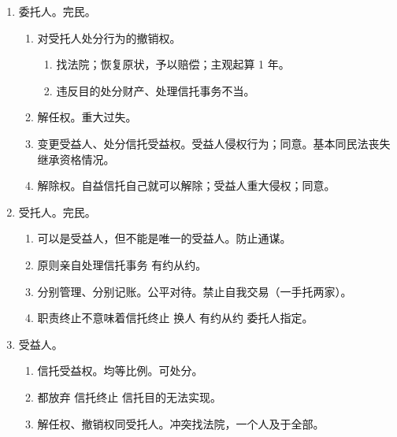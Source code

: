 \begin{enumerate}
\begin{enumerate}
        \end{enumerate}
  \item 委托人。完民。
        \begin{enumerate}
          \item 对受托人处分行为的撤销权。
                \begin{enumerate}
                  \item 找法院；恢复原状，予以赔偿；主观起算 1 年。
                  \item 违反目的处分财产、处理信托事务不当。
                \end{enumerate}
          \item 解任权。重大过失。
          \item 变更受益人、处分信托受益权。受益人侵权行为；同意。基本同民法丧失继承资格情况。
          \item 解除权。自益信托自己就可以解除；受益人重大侵权；同意。
        \end{enumerate}
  \item 受托人。完民。
        \begin{enumerate}
          \item 可以是受益人，但不能是唯一的受益人。防止通谋。
          \item 原则亲自处理信托事务 \yjt 有约从约。
          \item 分别管理、分别记账。公平对待。禁止自我交易（一手托两家）。
          \item 职责终止不意味着信托终止 \yjt 换人 \yjt 有约从约 \yjt 委托人指定。
        \end{enumerate}
  \item 受益人。
        \begin{enumerate}
          \item 信托受益权。均等比例。可处分。
          \item 都放弃 \yjt 信托终止 \yjt 信托目的无法实现。
          \item 解任权、撤销权同受托人。冲突找法院，一个人及于全部。
        \end{enumerate}
\end{enumerate}
